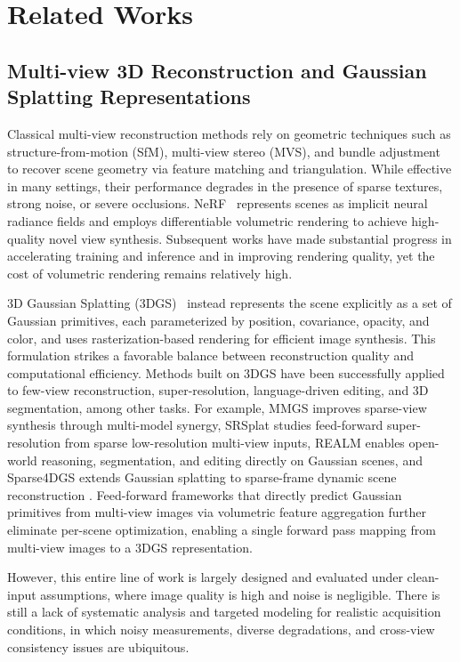 \section{Related Works}
\label{sec:related}

\subsection{Multi-view 3D Reconstruction and Gaussian Splatting Representations}

Classical multi-view reconstruction methods rely on geometric techniques such as structure-from-motion (SfM), multi-view stereo (MVS), and bundle adjustment to recover scene geometry via feature matching and triangulation. While effective in many settings, their performance degrades in the presence of sparse textures, strong noise, or severe occlusions. NeRF~\cite{mildenhall2020nerf} represents scenes as implicit neural radiance fields and employs differentiable volumetric rendering to achieve high-quality novel view synthesis. Subsequent works have made substantial progress in accelerating training and inference and in improving rendering quality, yet the cost of volumetric rendering remains relatively high.

3D Gaussian Splatting (3DGS)~\cite{kerbl3Dgaussians} instead represents the scene explicitly as a set of Gaussian primitives, each parameterized by position, covariance, opacity, and color, and uses rasterization-based rendering for efficient image synthesis. This formulation strikes a favorable balance between reconstruction quality and computational efficiency. Methods built on 3DGS have been successfully applied to few-view reconstruction, super-resolution, language-driven editing, and 3D segmentation, among other tasks. For example, MMGS improves sparse-view synthesis through multi-model synergy, SRSplat studies feed-forward super-resolution from sparse low-resolution multi-view inputs, REALM enables open-world reasoning, segmentation, and editing directly on Gaussian scenes, and Sparse4DGS extends Gaussian splatting to sparse-frame dynamic scene reconstruction \cite{shi2025mmgs,hu2025srsplat,shi2025realm,shi2025sparse4dgs}. Feed-forward frameworks that directly predict Gaussian primitives from multi-view images via volumetric feature aggregation further eliminate per-scene optimization, enabling a single forward pass mapping from multi-view images to a 3DGS representation.

However, this entire line of work is largely designed and evaluated under clean-input assumptions, where image quality is high and noise is negligible. There is still a lack of systematic analysis and targeted modeling for realistic acquisition conditions, in which noisy measurements, diverse degradations, and cross-view consistency issues are ubiquitous.


